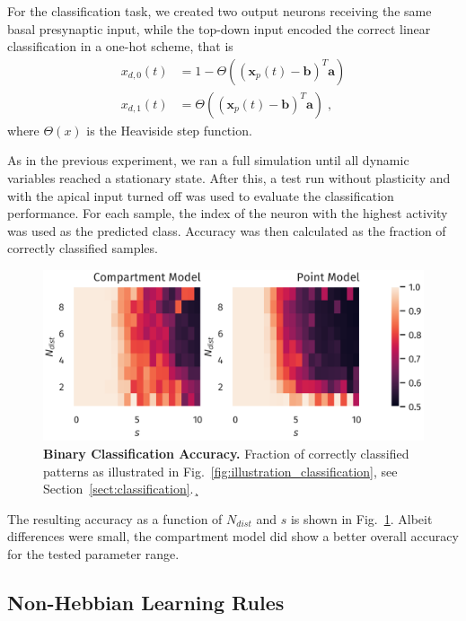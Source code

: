 \documentclass[10pt,a4paper,twocolumn]{article}
\begin{document}
		For the classification task, we created two output neurons receiving
		the same basal presynaptic input, while the top-down input encoded
		the correct linear classification in a one-hot scheme, that is
		\begin{align}
			x_{d,0}(t) &= 1 - \Theta\left( \left(\mathbf{x}_p(t) - \mathbf{b}\right)^T \mathbf{a}\right) \\
			x_{d,1}(t) &= \Theta\left( \left(\mathbf{x}_p(t) - \mathbf{b}\right)^T \mathbf{a}\right) \; ,
		\end{align}
		where $\Theta(x)$ is the Heaviside step function.
		
		As in the previous experiment, we ran a full simulation until 
		all dynamic variables reached a stationary state. After this,
		a test run without plasticity and with the apical input turned off 
		was used to evaluate the classification	performance. For each sample,
		the index of the neuron with the highest activity was used
		as the predicted class. Accuracy was then calculated as the fraction
		of correctly classified samples.
		\begin{figure}
			\includegraphics[width=\columnwidth]{classification_dimension_scaling}
			\caption{{\bf Binary Classification Accuracy.}
			Fraction of correctly classified patterns as illustrated in
			Fig.~\ref{fig:illustration_classification}, see 
			Section~\ref{sect:classification}.¸}
		\label{fig:classification_accuracy}
		\end{figure}
		
		The resulting accuracy as a function of $N_{dist}$ and $s$
		is shown in Fig.~\ref{fig:classification_accuracy}.
		Albeit differences were small, the compartment model did
		show a better overall accuracy for the tested parameter range.
		
		\subsection{Non-Hebbian Learning Rules}
		\label{sect:non-hebbian}
		
\end{document}
